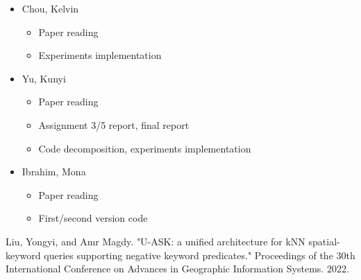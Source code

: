 \documentclass[]{IEEEphot}
\begin{document}
\begin{itemize}
\item Chou, Kelvin
\begin{itemize}
    \item Paper reading
    \item Experiments implementation
\end{itemize}
\item Yu, Kunyi
\begin{itemize}
    \item Paper reading
    \item Assignment 3/5 report, final report
    \item Code decomposition, experiments implementation
\end{itemize}
\item Ibrahim, Mona
\begin{itemize}
    \item Paper reading
    \item First/second version code
\end{itemize}
\end {itemize}

\begin{thebibliography}{10}
     Liu, Yongyi, and Amr Magdy. "U-ASK: a unified architecture for kNN spatial-keyword queries supporting negative keyword predicates." Proceedings of the 30th International Conference on Advances in Geographic Information Systems. 2022.
\end{thebibliography}
\end{document}
